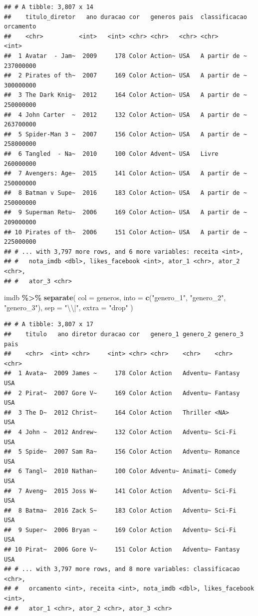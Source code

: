 \documentclass[
]{book}
\newenvironment{Shaded}{\begin{snugshade}}{\end{snugshade}}
\newcommand{\CharTok}[1]{\textcolor[rgb]{0.31,0.60,0.02}{#1}}
\newcommand{\DataTypeTok}[1]{\textcolor[rgb]{0.13,0.29,0.53}{#1}}
\newcommand{\KeywordTok}[1]{\textcolor[rgb]{0.13,0.29,0.53}{\textbf{#1}}}
\newcommand{\NormalTok}[1]{#1}
\newcommand{\OperatorTok}[1]{\textcolor[rgb]{0.81,0.36,0.00}{\textbf{#1}}}
\newcommand{\StringTok}[1]{\textcolor[rgb]{0.31,0.60,0.02}{#1}}
\begin{document}
\begin{verbatim}
## # A tibble: 3,807 x 14
##    titulo_diretor   ano duracao cor   generos pais  classificacao orcamento
##    <chr>          <int>   <int> <chr> <chr>   <chr> <chr>             <int>
##  1 Avatar  - Jam~  2009     178 Color Action~ USA   A partir de ~ 237000000
##  2 Pirates of th~  2007     169 Color Action~ USA   A partir de ~ 300000000
##  3 The Dark Knig~  2012     164 Color Action~ USA   A partir de ~ 250000000
##  4 John Carter  ~  2012     132 Color Action~ USA   A partir de ~ 263700000
##  5 Spider-Man 3 ~  2007     156 Color Action~ USA   A partir de ~ 258000000
##  6 Tangled  - Na~  2010     100 Color Advent~ USA   Livre         260000000
##  7 Avengers: Age~  2015     141 Color Action~ USA   A partir de ~ 250000000
##  8 Batman v Supe~  2016     183 Color Action~ USA   A partir de ~ 250000000
##  9 Superman Retu~  2006     169 Color Action~ USA   A partir de ~ 209000000
## 10 Pirates of th~  2006     151 Color Action~ USA   A partir de ~ 225000000
## # ... with 3,797 more rows, and 6 more variables: receita <int>,
## #   nota_imdb <dbl>, likes_facebook <int>, ator_1 <chr>, ator_2 <chr>,
## #   ator_3 <chr>
\end{verbatim}

\begin{Shaded}
\begin{Highlighting}[]
\NormalTok{imdb }\OperatorTok{\%>\%}
\StringTok{  }\KeywordTok{separate}\NormalTok{(}
    \DataTypeTok{col =}\NormalTok{ generos,}
    \DataTypeTok{into =} \KeywordTok{c}\NormalTok{(}\StringTok{"genero\_1"}\NormalTok{, }\StringTok{"genero\_2"}\NormalTok{, }\StringTok{"genero\_3"}\NormalTok{),}
    \DataTypeTok{sep =} \StringTok{"}\CharTok{\textbackslash{}\textbackslash{}}\StringTok{|"}\NormalTok{,}
    \DataTypeTok{extra =} \StringTok{"drop"}
\NormalTok{  )}
\end{Highlighting}
\end{Shaded}

\begin{verbatim}
## # A tibble: 3,807 x 17
##    titulo   ano diretor duracao cor   genero_1 genero_2 genero_3 pais 
##    <chr>  <int> <chr>     <int> <chr> <chr>    <chr>    <chr>    <chr>
##  1 Avata~  2009 James ~     178 Color Action   Adventu~ Fantasy  USA  
##  2 Pirat~  2007 Gore V~     169 Color Action   Adventu~ Fantasy  USA  
##  3 The D~  2012 Christ~     164 Color Action   Thriller <NA>     USA  
##  4 John ~  2012 Andrew~     132 Color Action   Adventu~ Sci-Fi   USA  
##  5 Spide~  2007 Sam Ra~     156 Color Action   Adventu~ Romance  USA  
##  6 Tangl~  2010 Nathan~     100 Color Adventu~ Animati~ Comedy   USA  
##  7 Aveng~  2015 Joss W~     141 Color Action   Adventu~ Sci-Fi   USA  
##  8 Batma~  2016 Zack S~     183 Color Action   Adventu~ Sci-Fi   USA  
##  9 Super~  2006 Bryan ~     169 Color Action   Adventu~ Sci-Fi   USA  
## 10 Pirat~  2006 Gore V~     151 Color Action   Adventu~ Fantasy  USA  
## # ... with 3,797 more rows, and 8 more variables: classificacao <chr>,
## #   orcamento <int>, receita <int>, nota_imdb <dbl>, likes_facebook <int>,
## #   ator_1 <chr>, ator_2 <chr>, ator_3 <chr>
\end{verbatim}
\end{document}
